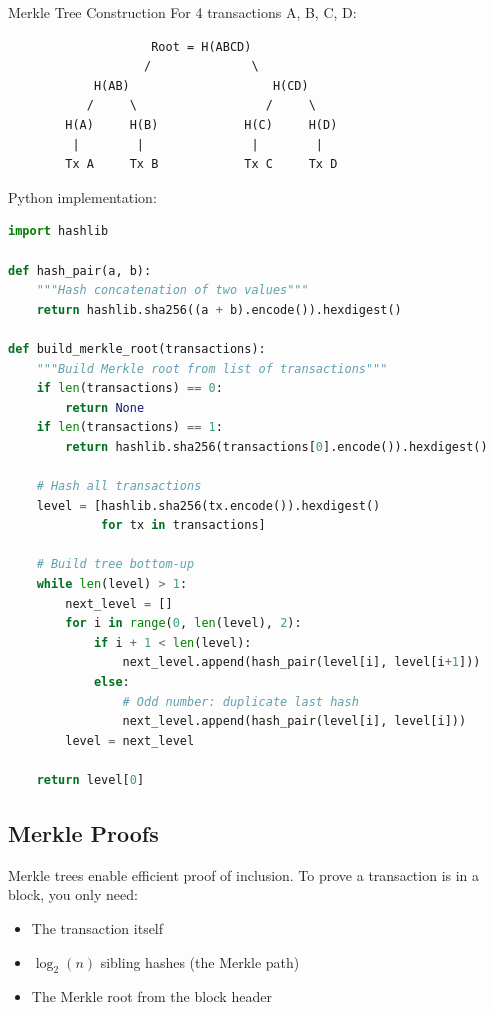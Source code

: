 \documentclass[11pt,a4paper]{article}
\begin{document}
\begin{examplebox}{Merkle Tree Construction}
For 4 transactions A, B, C, D:

\begin{verbatim}
                    Root = H(ABCD)
                   /              \
            H(AB)                    H(CD)
           /     \                  /     \
        H(A)     H(B)            H(C)     H(D)
         |        |               |        |
        Tx A     Tx B            Tx C     Tx D
\end{verbatim}

Python implementation:
\begin{lstlisting}[language=Python]
import hashlib

def hash_pair(a, b):
    """Hash concatenation of two values"""
    return hashlib.sha256((a + b).encode()).hexdigest()

def build_merkle_root(transactions):
    """Build Merkle root from list of transactions"""
    if len(transactions) == 0:
        return None
    if len(transactions) == 1:
        return hashlib.sha256(transactions[0].encode()).hexdigest()

    # Hash all transactions
    level = [hashlib.sha256(tx.encode()).hexdigest()
             for tx in transactions]

    # Build tree bottom-up
    while len(level) > 1:
        next_level = []
        for i in range(0, len(level), 2):
            if i + 1 < len(level):
                next_level.append(hash_pair(level[i], level[i+1]))
            else:
                # Odd number: duplicate last hash
                next_level.append(hash_pair(level[i], level[i]))
        level = next_level

    return level[0]
\end{lstlisting}
\end{examplebox}

\subsection{Merkle Proofs}

Merkle trees enable efficient proof of inclusion. To prove a transaction is in a block, you only need:
\begin{itemize}
  \item The transaction itself
  \item $\log_2(n)$ sibling hashes (the Merkle path)
  \item The Merkle root from the block header
\end{itemize}
\end{document}
